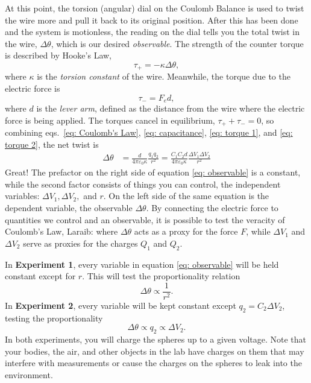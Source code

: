 \documentclass[addpoints]{physlabs}
\begin{document}
\begin{labsection}
\begin{theory}
    At this point, the torsion (angular) dial on the Coulomb Balance is used to twist the wire more and pull it back to its original position.
    After this has been done and the system is motionless, the reading on the dial tells you the total twist in the wire, $\Delta \theta$, which is our desired \textit{observable}.
    The strength of the counter torque is described by Hooke's Law,
    \begin{equation}\label{eq: torque 1}
        \tau_+ = -\kappa\Delta \theta,
    \end{equation}
    where $\kappa$ is the {\sl torsion constant} of the wire.
    Meanwhile, the torque due to the electric force is
    \begin{equation}\label{eq: torque 2}
        \tau_- = F_e d,
    \end{equation}
    where $d$ is the {\sl lever arm}, defined as the distance from the wire where the electric force is being applied. The torques cancel in equilibrium, $\tau_++\tau_- = 0$, so combining eqs.~\ref{eq: Coulomb's Law}, \ref{eq: capacitance}, \ref{eq: torque 1}, and \ref{eq: torque 2}, the net twist is
    \begin{align}
        \Delta\theta &=\frac{d}{4\pi\varepsilon_0\kappa}\frac{q_1q_2}{r^2}=\frac{C_1C_2d}{4\pi\varepsilon_0\kappa}\frac{\Delta V_1\Delta V_2}{r^2}\label{eq: observable}
    \end{align}
    Great!
    The prefactor on the right side of equation \ref{eq: observable} is a constant, while the second factor consists of things you can control, the independent variables: $\Delta V_1, \Delta V_2, $ and $r$.
    On the left side of the same equation is the dependent variable, the observable $\Delta \theta$.
    By connecting the electric force to quantities we control and an observable, it is possible to test the veracity of Coulomb's Law, {\color{red} Laraib: where $\Delta\theta$ acts as a proxy for the force $F$, while $\Delta V_1$ and $\Delta V_2$ serve as proxies for the charges $Q_1$ and $Q_2$.}

    In {\bf Experiment 1}, every variable in equation \ref{eq: observable} will be held constant except for $r$. This will test the proportionality relation
    \begin{equation*}
        \Delta \theta\propto \frac{1}{r^2}.
    \end{equation*}
    In {\bf Experiment 2}, every variable will be kept constant except $q_2=C_2\Delta V_2$, testing the proportionality
    \begin{equation*}
        \Delta \theta\propto q_2\propto \Delta V_2.
    \end{equation*}
    In both experiments, you will charge the spheres up to a given voltage. Note that your bodies, the air, and other objects in the lab have charges on them that may interfere with measurements or cause the charges on the spheres to leak into the environment.
\end{theory}


\end{labsection}
\end{document}
